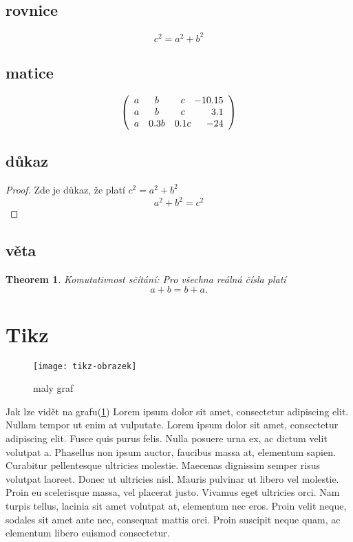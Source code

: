 \documentclass[10pt,a4paper]{article}
\newtheorem{theorem}{Theorem}
\begin{document}
\subsection{rovnice}
\begin{displaymath}
c^{2}=a^{2}+b^{2}
\end{displaymath}
\subsection{matice}
$$\left( \begin{array}{ccc@{\ }r}
    a & b & c & -10.15 \\
    a & b & c & 3.1 \\
    a & 0.3 b & 0.1c & -24 \\
    \end{array} \right)$$
\subsection{důkaz}
\begin{proof}
Zde je důkaz, že platí 
$c^{2}=a^{2}+b^{2}$
\[
a^2 + b^2 = c^2 
\]
\end{proof}
\subsection{věta}
\begin{theorem}Komutativnost sčítání:
Pro všechna reálná čísla platí
\[
a+b=b+a.
\]
\end{theorem}
\newpage
\section{Tikz}
\begin{figure}[h]
    \centering
    \texttt{[image: tikz-obrazek]}
    \caption{maly graf}
    \label{fig:graf}
\end{figure}	
\newpage
Jak lze vidět na grafu(\ref{fig:graf}) Lorem ipsum dolor sit amet, consectetur adipiscing elit. Nullam tempor ut enim at vulputate. Lorem ipsum dolor sit amet, consectetur adipiscing elit. Fusce quis purus felis. Nulla posuere urna ex, ac dictum velit volutpat a. Phasellus non ipsum auctor, faucibus massa at, elementum sapien. Curabitur pellentesque ultricies molestie. Maecenas dignissim semper risus volutpat laoreet. Donec ut ultricies nisl. Mauris pulvinar ut libero vel molestie. Proin eu scelerisque massa, vel placerat justo. Vivamus eget ultricies orci. Nam turpis tellus, lacinia sit amet volutpat at, elementum nec eros. Proin velit neque, sodales sit amet ante nec, consequat mattis orci. Proin suscipit neque quam, ac elementum libero euismod consectetur.
\end{document}

